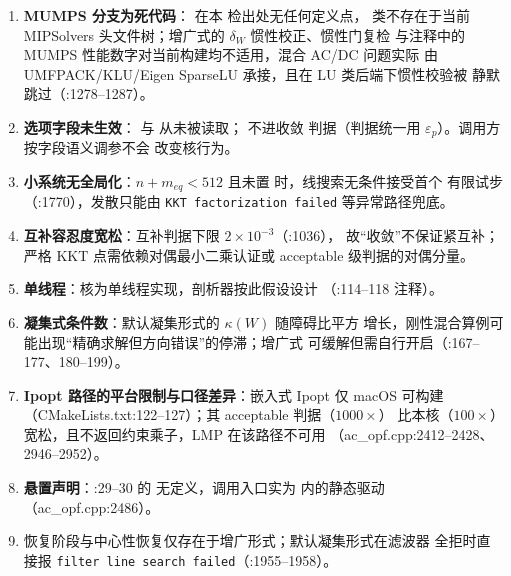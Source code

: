 \begin{enumerate}
  \item \textbf{MUMPS 分支为死代码}： 在本
        检出处无任何定义点， 类不存在于当前
        MIPSolvers 头文件树；增广式的 $\delta_W$ 惯性校正、惯性门复检
        与注释中的 MUMPS 性能数字对当前构建均不适用，混合 AC/DC 问题实际
        由 UMFPACK/KLU/Eigen SparseLU 承接，且在 LU 类后端下惯性校验被
        静默跳过（:1278--1287）。
  \item \textbf{选项字段未生效}：
        与  从未被读取； 不进收敛
        判据（判据统一用 $\varepsilon_p$）。调用方按字段语义调参不会
        改变核行为。
  \item \textbf{小系统无全局化}：$n+m_{eq}<512$ 且未置
         时，线搜索无条件接受首个
        有限试步（:1770），发散只能由 \texttt{KKT factorization failed}
        等异常路径兜底。
  \item \textbf{互补容忍度宽松}：互补判据下限 $2\times10^{-3}$（:1036），
        故“收敛”不保证紧互补；严格 KKT 点需依赖对偶最小二乘认证或
        acceptable 级判据的对偶分量。
  \item \textbf{单线程}：核为单线程实现，剖析器按此假设设计
        （:114--118 注释）。
  \item \textbf{凝集式条件数}：默认凝集形式的 $\kappa(W)$ 随障碍比平方
        增长，刚性混合算例可能出现“精确求解但方向错误”的停滞；增广式
        可缓解但需自行开启（:167--177、180--199）。
  \item \textbf{Ipopt 路径的平台限制与口径差异}：嵌入式 Ipopt 仅 macOS
        可构建（CMakeLists.txt:122--127）；其 acceptable 判据（$1000\times$）
        比本核（$100\times$）宽松，且不返回约束乘子，LMP 在该路径不可用
        （ac\_opf.cpp:2412--2428、2946--2952）。
  \item \textbf{悬置声明}：:29--30 的
         无定义，调用入口实为
         内的静态驱动（ac\_opf.cpp:2486）。
  \item 恢复阶段与中心性恢复仅存在于增广形式；默认凝集形式在滤波器
        全拒时直接报 \texttt{filter line search failed}（:1955--1958）。
\end{enumerate}
